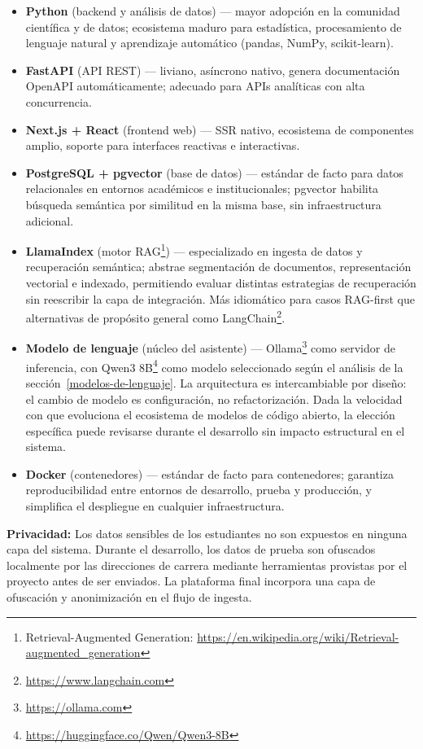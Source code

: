 \documentclass[
  spanish,
]{article}
\begin{document}
\begin{itemize}
\item \textbf{Python} (backend y análisis de datos) --- mayor adopción en la comunidad científica y de datos; ecosistema maduro para estadística, procesamiento de lenguaje natural y aprendizaje automático (pandas, NumPy, scikit-learn).
\item \textbf{FastAPI} (API REST) --- liviano, asíncrono nativo, genera documentación OpenAPI automáticamente; adecuado para APIs analíticas con alta concurrencia.
\item \textbf{Next.js + React} (frontend web) --- SSR nativo, ecosistema de componentes amplio, soporte para interfaces reactivas e interactivas.
\item \textbf{PostgreSQL + pgvector} (base de datos) --- estándar de facto para datos relacionales en entornos académicos e institucionales; pgvector habilita búsqueda semántica por similitud en la misma base, sin infraestructura adicional.
\item \textbf{LlamaIndex} (motor RAG\footnote{Retrieval-Augmented Generation: \url{https://en.wikipedia.org/wiki/Retrieval-augmented_generation}}) --- especializado en ingesta de datos y recuperación semántica; abstrae segmentación de documentos, representación vectorial e indexado, permitiendo evaluar distintas estrategias de recuperación sin reescribir la capa de integración. Más idiomático para casos RAG-first que alternativas de propósito general como LangChain\footnote{\url{https://www.langchain.com}}.
\item \textbf{Modelo de lenguaje} (núcleo del asistente) --- Ollama\footnote{\url{https://ollama.com}} como servidor de inferencia, con Qwen3 8B\footnote{\url{https://huggingface.co/Qwen/Qwen3-8B}} como modelo seleccionado según el análisis de la sección~\ref{modelos-de-lenguaje}. La arquitectura es intercambiable por diseño: el cambio de modelo es configuración, no refactorización. Dada la velocidad con que evoluciona el ecosistema de modelos de código abierto, la elección específica puede revisarse durante el desarrollo sin impacto estructural en el sistema.
\item \textbf{Docker} (contenedores) --- estándar de facto para contenedores; garantiza reproducibilidad entre entornos de desarrollo, prueba y producción, y simplifica el despliegue en cualquier infraestructura.
\end{itemize}

\textbf{Privacidad:} Los datos sensibles de los estudiantes no son
expuestos en ninguna capa del sistema. Durante el desarrollo, los datos
de prueba son ofuscados localmente por las direcciones de carrera
mediante herramientas provistas por el proyecto antes de ser enviados.
La plataforma final incorpora una capa de ofuscación y anonimización en
el flujo de ingesta.
\end{document}
